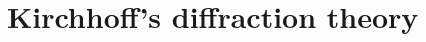 \documentclass[12pt,twoside,english]{book}
\renewcommand{\~}{\perispomeni}%
\numberwithin{equation}{section}
\numberwithin{figure}{section}
\begin{document}


%
%
\section{Kirchhoff's diffraction theory}

\begin{figure}
\begin{minipage}[t]{0.48\textwidth}

\caption{}
\label{fig:aperture}
\end{minipage}
\hfill
\begin{minipage}[t]{0.48\textwidth}

\caption{}
\label{fig:aperture coord}
\end{minipage}
\end{figure}
\end{document}

